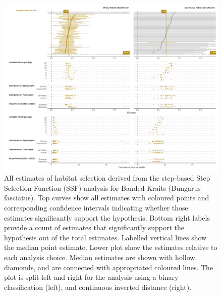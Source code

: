 \documentclass[10pt,a4paper]{article}
\begin{document}
\begin{figure}
\includegraphics[width=1\linewidth]{../../figures/specCurve_Bungarus fasciatus_ssf} \caption{All estimates of habitat selection derived from the step-based Step Selection Function (SSF) analysis for Banded Kraits (Bungarus fasciatus). Top curves show all estimates with coloured points and corresponding confidence intervals indicating whether those estimates significantly support the hypothesis. Bottom right labels provide a count of estimates that significantly support the hypothesis out of the total estimates. Labelled vertical lines show the median point estimate. Lower plot show the estimates relative to each analysis choice. Median estimates are shown with hollow diamonds, and are connected with appropriated coloured lines. The plot is split left and right for the analysis using a binary classification (left), and continuous inverted distance (right).}\label{fig:specCurveSsfBUFA}
\end{figure}
\end{document}
